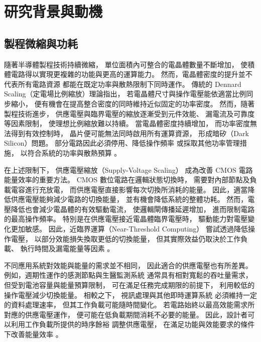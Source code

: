 \chapter{研究背景與動機}
\label{ch:background}


\section{製程微縮與功耗}
\label{sec:power_budget}

隨著半導體製程技術持續微縮，
單位面積內可整合的電晶體數量不斷增加，
使積體電路得以實現更複雜的功能與更高的運算能力。
然而，電晶體密度的提升並不代表所有電路資源
都能在既定功率與散熱限制下同時運作。
傳統的 Dennard Scaling（定電場比例縮放）理論指出，
若電晶體尺寸與操作電壓能依適當比例同步縮小，
便有機會在提高整合密度的同時維持近似固定的功率密度。
然而，隨著製程技術進步，
供應電壓與臨界電壓的縮放逐漸受到元件效能、
漏電流及可靠度等因素限制，
使理想比例縮放難以持續。
當電晶體密度持續增加，
而功率密度無法得到有效控制時，
晶片便可能無法同時啟用所有運算資源，
形成暗矽（Dark Silicon）問題。
部分電路因此必須停用、降低操作頻率
或採取其他功率管理措施，
以符合系統的功率與散熱預算
\cite{dreslinski2010}。

在上述限制下，
供應電壓縮放（Supply-Voltage Scaling）
成為改善 CMOS 電路能量效率的重要方法。
CMOS 數位電路在邏輯狀態切換時，
需要對內部節點及負載電容進行充放電，
而供應電壓直接影響每次切換所消耗的能量。
因此，適當降低供應電壓能夠減少電路的切換能量，
並有機會降低系統的整體功耗。
然而，電壓降低也會減少電晶體的有效驅動電流，
使邏輯閘傳播延遲增加，
進而限制電路的最高操作頻率。
特別是在供應電壓接近電晶體臨界電壓時，
驅動能力對電壓變化更加敏感。
因此，近臨界運算（Near-Threshold Computing）
嘗試透過降低操作電壓，
以部分效能損失換取更低的切換能量，
但其實際效益仍取決於工作負載、
執行時間及漏電能量等因素
\cite{dreslinski2010,chandrakasan1992}。

不同應用系統對效能與能量的需求並不相同，
因此適合的供應電壓也有所差異。
例如，週期性運作的感測節點與生醫監測系統
通常具有相對寬鬆的吞吐量需求，
但受到電池容量與能量預算限制，
可在滿足任務完成期限的前提下，
利用較低的操作電壓減少切換能量。
相較之下，
視訊處理與其他即時運算系統
必須維持一定的資料處理速率，
但其工作負載可能隨時間變化。
若電路始終以最高效能需求所對應的供應電壓運作，
便可能在低負載期間消耗不必要的能量。
因此，設計者可以利用工作負載所提供的時序餘裕
調整供應電壓，
在滿足功能與效能要求的條件下改善能量效率
\cite{chandrakasan1992,udvs2010}。

